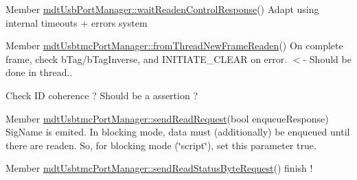 \label{todo__todo000057}
\hypertarget{todo__todo000057}{}
 
\begin{DoxyDescription}
\item[Member \hyperlink{classmdt_usb_port_manager_a34bf0ac118e586bf2547a98964a2230c}{mdtUsbPortManager::waitReadenControlResponse}() ]Adapt using internal timeouts + errors system 
\end{DoxyDescription}

\label{todo__todo000059}
\hypertarget{todo__todo000059}{}
 
\begin{DoxyDescription}
\item[Member \hyperlink{classmdt_usbtmc_port_manager_aca42b343ae1f6a324e6e45968f03bbea}{mdtUsbtmcPortManager::fromThreadNewFrameReaden}() ]On complete frame, check bTag/bTagInverse, and INITIATE\_\-CLEAR on error. $<$-\/ Should be done in thread.. 

Check ID coherence ? Should be a assertion ? 
\end{DoxyDescription}

\label{todo__todo000061}
\hypertarget{todo__todo000061}{}
 
\begin{DoxyDescription}
\item[Member \hyperlink{classmdt_usbtmc_port_manager_ab1604a1c8f2e9192714d039dbf9a5158}{mdtUsbtmcPortManager::sendReadRequest}(bool enqueueResponse) ]SigName is emited. In blocking mode, data must (additionally) be enqueued until there are readen. So, for blocking mode (\char`\"{}script\char`\"{}), set this parameter true. 
\end{DoxyDescription}

\label{todo__todo000058}
\hypertarget{todo__todo000058}{}
 
\begin{DoxyDescription}
\item[Member \hyperlink{classmdt_usbtmc_port_manager_a7bcc280bd4a26ed523832550b1e61553}{mdtUsbtmcPortManager::sendReadStatusByteRequest}() ]finish ! 
\end{DoxyDescription}